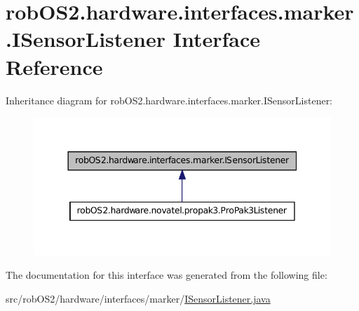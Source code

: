 \hypertarget{interfacerob_o_s2_1_1hardware_1_1interfaces_1_1marker_1_1_i_sensor_listener}{
\section{robOS2.hardware.interfaces.marker.ISensorListener Interface Reference}
\label{interfacerob_o_s2_1_1hardware_1_1interfaces_1_1marker_1_1_i_sensor_listener}
}


Inheritance diagram for robOS2.hardware.interfaces.marker.ISensorListener:\nopagebreak
\begin{figure}[H]
\begin{center}
\leavevmode
\includegraphics[width=344pt]{interfacerob_o_s2_1_1hardware_1_1interfaces_1_1marker_1_1_i_sensor_listener__inherit__graph}
\end{center}
\end{figure}


The documentation for this interface was generated from the following file:\begin{DoxyCompactItemize}
\item 
src/robOS2/hardware/interfaces/marker/\hyperlink{_i_sensor_listener_8java}{ISensorListener.java}\end{DoxyCompactItemize}
